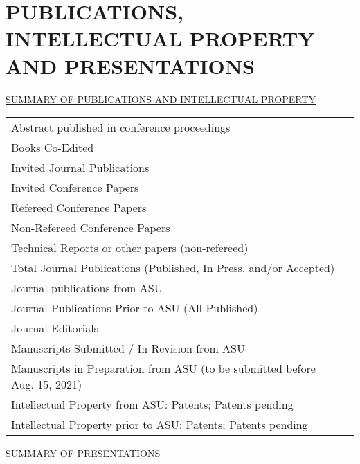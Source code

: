 \documentclass[letterpaper, 12pt]{extarticle}
\begin{document}
\part*{\uppercase{Publications, Intellectual Property and Presentations}}
\uppercase{\underline{Summary of Publications and Intellectual Property}}

\begin{tabular}{p{}p{}}
Abstract published in conference proceedings      & \\
Books Co-Edited                                   & \\
Invited Journal Publications                      & \\
Invited Conference Papers                         & \\
Refereed Conference Papers                        & \\
Non-Refereed Conference Papers                    & \\
Technical Reports or other papers (non-refereed)  & \\
Total Journal Publications \newline
(Published, In Press, and/or Accepted)            & \\
Journal publications from ASU                     & \\
Journal Publications Prior to ASU (All Published) & \\
Journal Editorials                                & \\
Manuscripts Submitted / In Revision from ASU      & \\
Manuscripts in Preparation from ASU \newline
(to be submitted before Aug. 15, 2021)            & \\
Intellectual Property from ASU: \newline
Patents; Patents pending                          & \\
Intellectual Property prior to ASU: \newline
Patents; Patents pending                          & \\
\end{tabular}

\vspace{1ex}
\uppercase{\underline{Summary of Presentations}}
\end{document}
